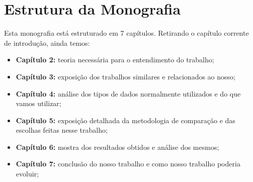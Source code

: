 \section{Estrutura da Monografia}

Esta monografia está estruturado em 7 capítulos. Retirando o capítulo corrente de introdução, ainda temos:

\begin{itemize}
    \item \textbf{Capítulo 2:} teoria necessária para o entendimento do trabalho;
    \item \textbf{Capítulo 3:} exposição dos trabalhos similares e relacionados ao nosso;
    \item \textbf{Capítulo 4:} análise dos tipos de dados normalmente utilizados e do que vamos utilizar;
    \item \textbf{Capítulo 5:} exposição detalhada da metodologia de comparação e das escolhas feitas nesse trabalho;
    \item \textbf{Capítulo 6:} mostra dos resultados obtidos e análise dos mesmos;
    \item \textbf{Capítulo 7:} conclusão do nosso trabalho e como nosso trabalho poderia evoluir;
\end{itemize}



